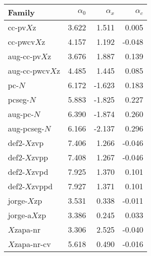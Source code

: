\begin{tabular}{l|r|r|r}
\textbf{Family} & $\alpha_0$ & $\alpha_x$ & $\alpha_c$ \\
\hline
cc-pv$X$z       & 3.622 &  1.511 &  0.005 \\
cc-pwcv$X$z     & 4.157 &  1.192 & -0.048 \\
aug-cc-pv$X$z   & 3.676 &  1.887 &  0.139 \\
aug-cc-pwcv$X$z & 4.485 &  1.445 &  0.085 \\
pc-$N$          & 6.172 & -1.623 &  0.183 \\
pcseg-$N$       & 5.883 & -1.825 &  0.227 \\
aug-pc-$N$      & 6.390 & -1.874 &  0.260 \\
aug-pcseg-$N$   & 6.166 & -2.137 &  0.296 \\
def2-$X$zvp     & 7.406 &  1.266 & -0.046 \\
def2-$X$zvpp    & 7.408 &  1.267 & -0.046 \\
def2-$X$zvpd    & 7.925 &  1.370 &  0.101 \\
def2-$X$zvppd   & 7.927 &  1.371 &  0.101 \\
jorge-$X$zp     & 3.531 &  0.338 & -0.011 \\
jorge-a$X$zp    & 3.386 &  0.245 &  0.033 \\
$X$zapa-nr      & 3.306 &  2.525 & -0.040 \\
$X$zapa-nr-cv   & 5.618 &  0.490 & -0.016 \\
\hline
\end{tabular}